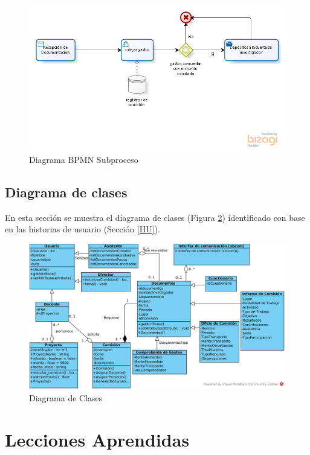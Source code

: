 \documentclass{report}
\begin{document}
    	\begin{figure}[H]
    		\centering
    		    \label{subProcesoBPMN}
    			\includegraphics[scale=0.80]{images/1models/envioGto.png}
    			\caption{Diagrama BPMN Subproceso}
    	\end{figure}
    
    \section{Diagrama de clases}
    En esta sección se muestra el diagrama de clases (Figura \ref{classDiagram}) identificado con base en las historias de usuario (Sección \ref{HU}).
      	\begin{figure}[H]
    		\centering
    		    \label{classDiagram}
    			\includegraphics[scale=0.80]{images/1models/DiagramaClases.png}
    			\caption{Diagrama de Clases}
    	\end{figure}
       
\chapter{Lecciones Aprendidas}
    
\end{document}
